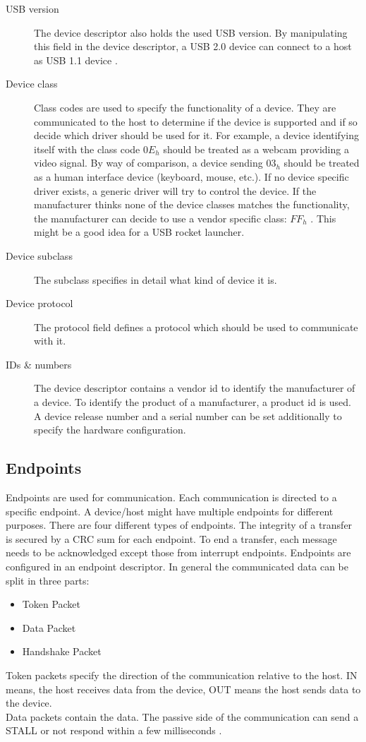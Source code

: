 \documentclass{acm_proc_article-sp}
\begin{document}
\begin{description}
\item[USB version]
The device descriptor also holds the used USB version.
By manipulating this field in the device descriptor, a USB 2.0 device can connect to a host as USB 1.1 device \cite{beyond}.

\item[Device class]
Class codes are used to specify the functionality of a device.
They are communicated to the host to determine if the device is supported and if so decide which driver should be used for it.
For example, a device identifying itself with the class code $0E_h$ should be treated as a webcam providing a video signal.
By way of comparison, a device sending $03_h$ should be treated as a human interface device (keyboard, mouse, etc.).
If no device specific driver exists, a generic driver will try to control the device.
If the manufacturer thinks none of the device classes matches the functionality, the manufacturer can decide to use a
vendor specific class: $FF_h$ \cite{axel}.
This might be a good idea for a USB rocket launcher.

\item[Device subclass]
The subclass specifies in detail what kind of device it is.

\item[Device protocol]
The protocol field defines a protocol which should be used to communicate with it.

\item [IDs \& numbers]
The device descriptor contains a vendor id to identify the manufacturer of a device.
To identify the product of a manufacturer, a product id is used.
A device release number and a serial number can be set additionally to specify the
hardware configuration.

\end{description}

\subsection{Endpoints}
Endpoints are used for communication.
Each communication is directed to a specific endpoint.
A device/host might have multiple endpoints for different purposes.
There are four different types of endpoints.
The integrity of a transfer is secured by a CRC sum for each endpoint.
To end a transfer, each message needs to be acknowledged except those from interrupt endpoints.
Endpoints are configured in an endpoint descriptor.
In general the communicated data can be split in three parts: \cite{beyond}
\begin{itemize}
\item Token Packet
\item Data Packet
\item Handshake Packet
\end{itemize}
Token packets specify the direction of the communication relative to the host.
IN means, the host receives data from the device, OUT means the host sends data to the device.\\
Data packets contain the data.
The passive side of the communication can send a STALL or not respond within a few milliseconds
\cite{beyond}.
\end{document}
